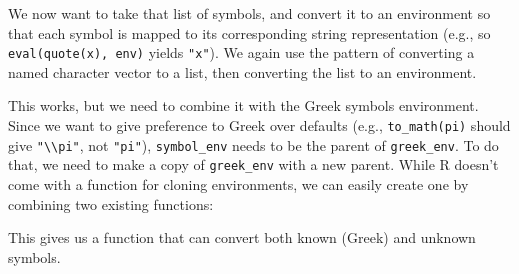 We now want to take that list of symbols, and convert it to an
environment so that each symbol is mapped to its corresponding string
representation (e.g., so \texttt{eval(quote(x), env)} yields
\texttt{"x"}). We again use the pattern of converting a named character
vector to a list, then converting the list to an environment.

\begin{Shaded}
\begin{Highlighting}[]
\StringTok{ }
  \StringTok{ }
  \StringTok{ }\NormalTok{(}
  \StringTok{ }

\NormalTok{\}}

\end{Highlighting}
\end{Shaded}

This works, but we need to combine it with the Greek symbols
environment. Since we want to give preference to Greek over defaults
(e.g., \texttt{to\_math(pi)} should give
\texttt{"\textbackslash{}\textbackslash{}pi"}, not \texttt{"pi"}),
\texttt{symbol\_env} needs to be the parent of \texttt{greek\_env}. To
do that, we need to make a copy of \texttt{greek\_env} with a new
parent. While R doesn't come with a function for cloning environments,
we can easily create one by combining two existing functions:

\begin{Shaded}
\begin{Highlighting}[]
\StringTok{ } 
  \NormalTok{(} 
\NormalTok{\}}
\end{Highlighting}
\end{Shaded}

This gives us a function that can convert both known (Greek) and unknown
symbols.

